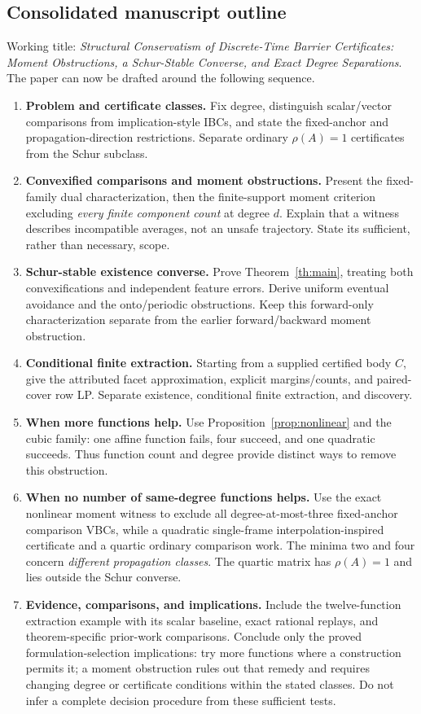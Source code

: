\documentclass[10pt,letterpaper]{article}
\theoremstyle{remark}
\begin{document}
\subsection*{Consolidated manuscript outline}
Working title: \emph{Structural Conservatism of Discrete-Time Barrier Certificates:
Moment Obstructions, a Schur-Stable Converse, and Exact Degree Separations}.
The paper can now be drafted around the following sequence.
\begin{enumerate}
\item \textbf{Problem and certificate classes.}
Fix degree, distinguish scalar/vector comparisons from implication-style
IBCs, and state the fixed-anchor and propagation-direction restrictions.
Separate ordinary $\rho(A)=1$ certificates from the Schur subclass.
\item \textbf{Convexified comparisons and moment obstructions.}
Present the fixed-family dual characterization, then the finite-support
moment criterion excluding \emph{every finite component count} at degree $d$.
Explain that a witness describes incompatible averages, not an unsafe trajectory.
State its sufficient, rather than necessary, scope.
\item \textbf{Schur-stable existence converse.}
Prove Theorem~\ref{th:main}, treating both convexifications and independent
feature errors. Derive uniform eventual avoidance and the onto/periodic
obstructions. Keep this forward-only characterization separate from the
earlier forward/backward moment obstruction.
\item \textbf{Conditional finite extraction.}
Starting from a supplied certified body $C$, give the attributed facet
approximation, explicit margins/counts, and paired-cover row LP.
Separate existence, conditional finite extraction, and discovery.
\item \textbf{When more functions help.}
Use Proposition~\ref{prop:nonlinear} and the cubic family: one affine function
fails, four succeed, and one quadratic succeeds. Thus function count and
degree provide distinct ways to remove this obstruction.
\item \textbf{When no number of same-degree functions helps.}
Use the exact nonlinear moment witness to exclude all degree-at-most-three
fixed-anchor comparison VBCs, while a quadratic single-frame
interpolation-inspired certificate and a quartic ordinary comparison work.
The minima two and four concern \emph{different propagation classes}.
The quartic matrix has $\rho(A)=1$ and lies outside the Schur converse.
\item \textbf{Evidence, comparisons, and implications.}
Include the twelve-function extraction example with its scalar baseline,
exact rational replays, and theorem-specific prior-work comparisons.
Conclude only the proved formulation-selection implications: try more functions
where a construction permits it; a moment obstruction rules out that remedy
and requires changing degree or certificate conditions within the stated classes.
Do not infer a complete decision procedure from these sufficient tests.
\end{enumerate}
\end{document}
